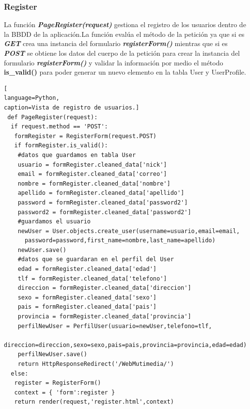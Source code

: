 \subsubsection*{Register}
La función \textit{\textbf{PageRegister(request)}} gestiona el registro de los usuarios dentro de la BBDD de la aplicación.La función evalúa el método de la petición ya que si es \textit{\textbf{GET}} crea una instancia del formulario \textit{\textbf{registerForm()}} mientras que si es  \textit{\textbf{POST}} se obtiene los datos del cuerpo de la petición para crear la instancia del formulario \textit{\textbf{registerForm()}} y validar la información por medio el método \textbf{is\_valid()} para poder generar un nuevo elemento en la tabla User y UserProfile.
\begin{lstlisting}[
language=Python,
caption=Vista de registro de usuarios.]
 def PageRegister(request):
  if request.method == 'POST':
   formRegister = RegisterForm(request.POST)
   if formRegister.is_valid():
    #datos que guardamos en tabla User
    usuario = formRegister.cleaned_data['nick']
    email = formRegister.cleaned_data['correo']
    nombre = formRegister.cleaned_data['nombre']
    apellido = formRegister.cleaned_data['apellido']
    password = formRegister.cleaned_data['password2']
    password2 = formRegister.cleaned_data['password2']
    #guardamos el usuario
    newUser = User.objects.create_user(username=usuario,email=email,
      password=password,first_name=nombre,last_name=apellido)
    newUser.save()
    #datos que se guardaran en el perfil del User
    edad = formRegister.cleaned_data['edad']
    tlf = formRegister.cleaned_data['telefono']
    direccion = formRegister.cleaned_data['direccion']
    sexo = formRegister.cleaned_data['sexo']
    pais = formRegister.cleaned_data['pais']
    provincia = formRegister.cleaned_data['provincia']
    perfilNewUser = PerfilUser(usuario=newUser,telefono=tlf,
      direccion=direccion,sexo=sexo,pais=pais,provincia=provincia,edad=edad)
    perfilNewUser.save()
	return HttpResponseRedirect('/WebMutimedia/')
  else:
   register = RegisterForm()
   context = { 'form':register }
   return render(request,'register.html',context)
\end{lstlisting}
